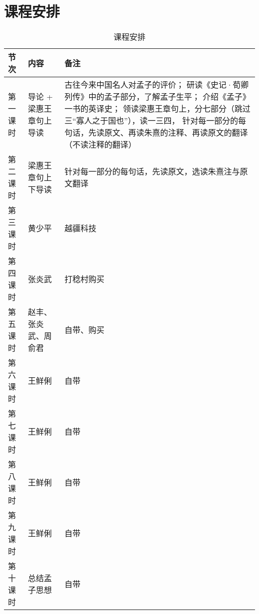 \documentclass[12pt]{ctexart}
\begin{document}
\section{课程安排}
\begin{table}[!ht]
  \centering
  \begin{tabular}{|p{2cm}|p{2cm}|p{6cm}|}
  \hline
  节次 & 内容 & 备注 \\
  \hline
 第一课时 & 导论 + 梁惠王章句上导读 & 古往今来中国名人对孟子的评价；
 研读《史记·荀卿列传》中的孟子部分，了解孟子生平；
 介绍《孟子》一书的英译史；
 领读梁惠王章句上，分七部分（跳过三“寡人之于国也”），读一三四，
 针对每一部分的每句话，先读原文、再读朱熹的注释、再读原文的翻译（不读注释的翻译）
 \\
  \hline
  第二课时 & 梁惠王章句上下导读 & 针对每一部分的每句话，先读原文，选读朱熹注与原文翻译\\
  \hline
  第三课时 & 黄少平 & 越疆科技 \\
  \hline
  第四课时 & 张炎武 & 打稔村购买  \\
  \hline
  第五课时 & 赵丰、张炎武、周俞君 & 自带、购买 \\
  \hline
  第六课时 & 王鲜俐 & 自带 \\
  \hline
  第七课时 & 王鲜俐 & 自带 \\
  \hline
  第八课时 & 王鲜俐 & 自带 \\
  \hline
  第九课时 & 王鲜俐 & 自带 \\
  \hline
  第十课时 & 总结孟子思想 & 自带 \\
  \hline
\end{tabular}
  \caption{课程安排}
\end{table}
\end{document}
